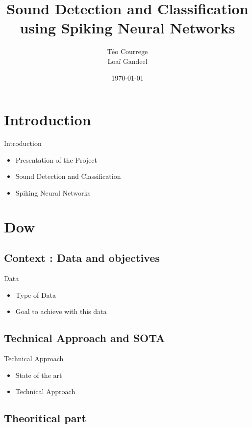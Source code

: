 \documentclass[aspectratio=169, 11pt]{beamer}
\title[Sound Detection and Classification]{\textbf{Sound Detection and Classification}\\ using Spiking Neural Networks}
\author[T. Courrege, L. Gandeel]{Téo Courrege\\Loaï Gandeel}
\date{\today}
\begin{document}
\begin{frame}[plain]
  \titlepage
\end{frame}

\section{Introduction}

\begin{frame}{Introduction}
  \begin{itemize}
    \item Presentation of the Project
    \item Sound Detection and Classification
    \item Spiking Neural Networks
  \end{itemize}
\end{frame}

\section{Dow}

\subsection{Context : Data and objectives}

\begin{frame}{Data}
  \begin{itemize}
    \item Type of Data
    \item Goal to achieve with this data
  \end{itemize}
\end{frame}

\subsection{Technical Approach and SOTA}

\begin{frame}{Technical Approach}
  \begin{itemize}
    \item State of the art
    \item Technical Approach
  \end{itemize}
\end{frame}

\subsection{Theoritical part}
\end{document}

